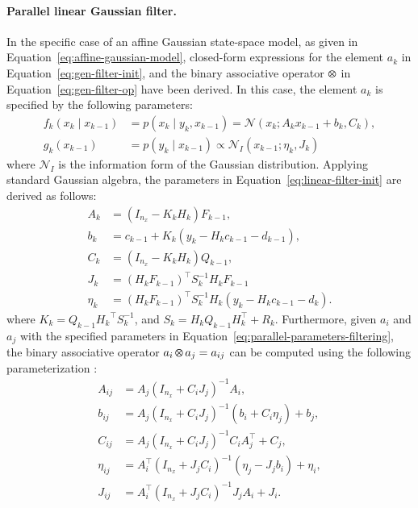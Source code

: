 \documentclass[dissertation,math,vertlayout,pdfa,colorlinks,nologo]{aaltoseries}
\DeclareMathOperator*{\Motimes}{\text{\raisebox{0.25ex}{\scalebox{0.65}{$\bigotimes$}}}}
\begin{document}
        \paragraph{\textbf{Parallel linear Gaussian filter.}} In the specific case of an affine Gaussian state-space model, as given in Equation~\eqref{eq:affine-gaussian-model}, closed-form expressions for the element $a_k$ in Equation~\eqref{eq:gen-filter-init}, and the binary associative operator $\Motimes$ in Equation~\eqref{eq:gen-filter-op} have been derived. In this case, the element $a_k$ is specified by the following parameters:
        \begin{equation} \label{eq:linear-filter-init}
            \begin{split}
               f_k(x_k \mid x_{k-1}) &= p(x_k \mid  y_k, x_{k-1}) =\mathcal{N}(x_k; A_k x_{k-1} + b_k, C_k),\\
               g_k(x_{k-1}) &= p(y_k \mid x_{k-1})\propto \mathcal{N}_I(x_{k-1}; \eta_k,J_k)
            \end{split}
        \end{equation}
        where $\mathcal{N}_I$ is the information form of the Gaussian distribution. Applying standard Gaussian algebra, the parameters in Equation~\eqref{eq:linear-filter-init} are derived as follows:
        \begin{equation} \label{eq:parallel-parameters-filtering}
            \begin{split}
                A_k &= (I_{n_x} - K_k H_k)F_{k-1}, \\
                b_k &= c_{k-1} + K_k( y_k - H_k c_{k-1} - d_{k-1}), \\
                C_k & = (I_{n_x} -K_k H_k) Q_{k-1}, \\
                J_k &= (H_k F_{k-1})^\top S_k^{-1} H_k F_{k-1} \\
                \eta_k &= (H_k F_{k-1} )^\top S_k^{-1} H_k  (y_k - H_k c_{k-1} - d_k).
            \end{split}
        \end{equation}
        where $ K_k = Q_{k-1}{H_k}^\top S_k^{-1}$, and $
        S_k = H_k Q_{k-1} H_k^\top+ R_k$. Furthermore, given $a_i$ and $a_j$ with the specified parameters in Equation~\eqref{eq:parallel-parameters-filtering}, the binary associative operator $a_i \Motimes a_j = a_{ij}$ can be computed using the following parameterization \cite[lemma 8]{sarkka2020temporal}:
        \begin{equation} \label{eq:op-filter}
            \begin{split}
                A_{ij} &= A_j (I_{n_x} + C_i J_j)^{-1} A_i,\\
                b_{ij} &= A_j (I_{n_x} + C_i J_j)^{-1} (b_i + C_i \eta_j) + b_j,\\
                C_{ij} &= A_j (I_{n_x} + C_i J_j)^{-1} C_i A_j^\top + C_j,\\
                \eta_{ij} &= A_i^\top (I_{n_x} + J_j C_i)^{-1} (\eta_j - J_j b_i) + \eta_i,\\
                J_{ij} &= A_i^\top (I_{n_x} + J_j C_i)^{-1} J_j A_i + J_i.
            \end{split}
        \end{equation}
\end{document}
